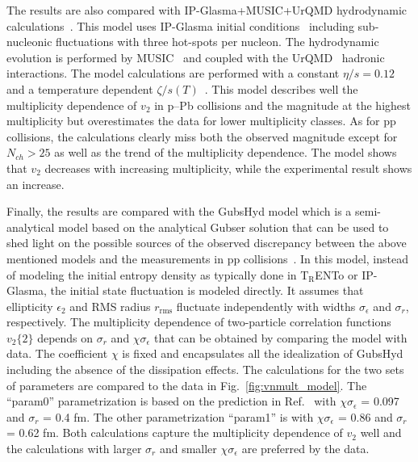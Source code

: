 The results are also compared with IP-Glasma+MUSIC+UrQMD hydrodynamic calculations~\cite{Schenke:2020mbo}. This model uses IP-Glasma initial conditions~\cite{Schenke:2012wb} including sub-nucleonic fluctuations with three hot-spots per nucleon. The hydrodynamic evolution is performed by MUSIC~\cite{Schenke:2010rr} and coupled with the UrQMD~\cite{Bass:1998ca,Bleicher:1999xi} hadronic interactions. 
The model calculations are performed with a constant $\eta/s=0.12$ and a temperature dependent $\zeta/s(T)$~\cite{Rose:2020lfc}. 
This model describes well the multiplicity dependence of $v_2$ in p--Pb collisions and the magnitude at the highest multiplicity but overestimates the data for lower multiplicity classes. As for pp collisions, the calculations clearly miss both the observed magnitude except for $N_{ch}>25$ as well as the trend of the multiplicity dependence. The model shows that $v_2$ decreases with increasing multiplicity, while the experimental result shows an increase.

Finally, the results are compared with the GubsHyd model which is a semi-analytical model based on the analytical Gubser solution that can be used to shed light on the possible sources of the observed discrepancy between the above mentioned models and the measurements in pp collisions~\cite{Taghavi:2019mqz}. In this model, instead of modeling the initial entropy density as typically done in T$_{\text{R}}$ENTo or IP-Glasma, the initial state fluctuation is modeled directly. It assumes that ellipticity $\epsilon_{2}$ and RMS radius $r_{\text{rms}}$ fluctuate independently with widths $\sigma_{\epsilon}$
 and $\sigma_{r}$, respectively. The multiplicity dependence of two-particle correlation functions $v_2\{2\}$ depends on $\sigma_{r}$ and  $\chi\sigma_{\epsilon}$ that can be obtained by comparing the model with data. The coefficient $\chi$ is fixed and encapsulates all the idealization of GubsHyd including the absence of the dissipation effects. The calculations for the two sets of parameters are compared
to the data in Fig.~\ref{fig:vnmult_model}. The “param0” parametrization is based on the prediction in Ref.~\cite{Taghavi:2019mqz} with $\chi \sigma_{\epsilon}$ = 0.097 and $\sigma_{r}$ = 0.4 fm. The other parametrization “param1” is with $\chi \sigma_{\epsilon}$ = 0.86 and $\sigma_{r}$ = 0.62 fm. Both calculations capture the multiplicity dependence of $v_2$ well and the calculations with larger $\sigma_{r}$ and smaller $\chi \sigma_{\epsilon}$ are preferred by the data.
 
